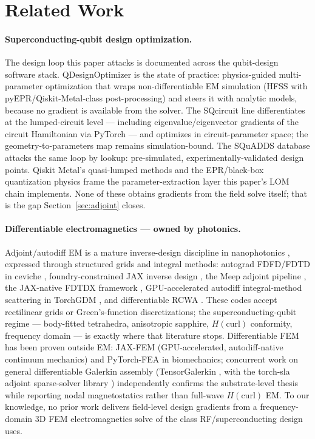 \documentclass{anvil-paper}
\begin{document}
\section{Related Work}
\label{sec:related}

\paragraph{Superconducting-qubit design optimization.}
The design loop this paper attacks is documented across the qubit-design
software stack. QDesignOptimizer \citep{eriksson2025automated} is the
state of practice: physics-guided multi-parameter optimization that
wraps non-differentiable EM simulation (HFSS with pyEPR/Qiskit-Metal-class
post-processing) and steers it with analytic models, because no gradient
is available from the solver. The SQcircuit line
\citep{rajabzadeh2023analysis,rajabzadeh2024general} differentiates at
the lumped-circuit level --- including eigenvalue/eigenvector gradients
of the circuit Hamiltonian via PyTorch --- and optimizes in circuit-parameter
space; the geometry-to-parameters map remains simulation-bound. The
SQuADDS database \citep{shanto2024squadds} attacks the same loop by
lookup: pre-simulated, experimentally-validated design points. Qiskit
Metal's quasi-lumped methods \citep{minev2021circuit} and the
EPR/black-box quantization physics
\citep{koch2007,nigg2012,minev2021} frame the parameter-extraction layer
this paper's LOM chain implements. None of these obtains gradients from
the field solve itself; that is the gap Section~\ref{sec:adjoint} closes.

\paragraph{Differentiable electromagnetics --- owned by photonics.}
Adjoint/autodiff EM is a mature inverse-design discipline in
nanophotonics \citep{molesky2018inverse}, expressed through structured
grids and integral methods: autograd FDFD/FDTD in ceviche
\citep{hughes2019forward}, foundry-constrained JAX inverse design
\citep{schubert2022inverse}, the Meep adjoint pipeline
\citep{hammond2022high}, the JAX-native FDTDX framework
\citep{mahlau2026fdtdx}, GPU-accelerated autodiff integral-method
scattering in TorchGDM \citep{ponomareva2025torchgdm}, and
differentiable RCWA \citep{kim2024meent}. These codes accept rectilinear
grids or Green's-function discretizations; the superconducting-qubit
regime --- body-fitted tetrahedra, anisotropic sapphire,
$H(\mathrm{curl})$ conformity, frequency domain --- is exactly where that
literature stops. Differentiable FEM has been proven outside EM: JAX-FEM
\citep{xue2023jax} (GPU-accelerated, autodiff-native continuum mechanics)
and PyTorch-FEA \citep{liang2023pytorch} in biomechanics; concurrent work
on general differentiable Galerkin assembly (TensorGalerkin
\citep{wen2026learning}, with the torch-sla adjoint sparse-solver library
\citep{chi2026torch}) independently confirms the substrate-level thesis
while reporting nodal magnetostatics rather than full-wave
$H(\mathrm{curl})$ EM. To our knowledge, no prior work delivers
field-level design gradients from a frequency-domain 3D FEM
electromagnetics solve of the class RF/superconducting design uses.
\end{document}

